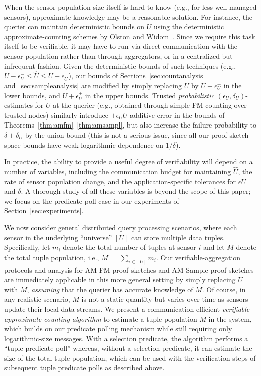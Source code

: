 \documentclass[10pt,twocolumn]{article}
\newcommand{\amfm}{AM-FM\xspace}
\newcommand{\amsampl}{AM-Sample\xspace}
\newcommand{\proofsketch}{proof sketch\xspace}
\newcommand{\proofsketches}{proof sketches\xspace}
\newcommand{\sstitle}[1]{\noindent{\bf #1\/}}
\begin{document}
{When the sensor population size itself is hard to know (e.g., for less well
managed sensors), approximate knowledge may
be a reasonable solution.  For instance, the querier can maintain
deterministic bounds on $U$ using the
deterministic approximate-counting schemes by Olston and
Widom~\cite{olston2000}.   Since we require this task itself to be
verifiable, it may have to run via direct communication with the
sensor population rather than through aggregators, or in a centralized but infrequent fashion.
Given the deterministic bounds of such techniques (e.g., 
$U-\epsilon^-_U \le \hat{U} \le U+\epsilon^+_U$),
our bounds of Sections~\ref{sec:countanalysis}
and~\ref{sec:sampleanalysis} are modified by simply replacing $U$ by
$U-\epsilon^-_U$ in the lower bounds, and $U+\epsilon^+_U$ in the upper
bounds.  
Trusted \emph{probabilistic} $(\epsilon_U, \delta_U)$-estimates for 
$U$ at the querier (e.g., obtained through simple FM counting over 
trusted nodes) similarly introduce $\pm\epsilon_U U$ additive error in
the bounds of Theorems~\ref{thm:amfm}--\ref{thm:amsampl}, but also 
increase the failure probability to $\delta+\delta_U$ by the union 
bound (this is not a serious issue, since all our \proofsketch  space bounds
 have weak logarithmic dependence on $1/\delta$).

In practice, the ability
to provide a useful degree of verifiability will depend on a number of
variables, including the communication budget for maintaining $\hat{U}$,
the rate of sensor population change, and the application-specific
tolerances for $\epsilon U$ and $\delta$.  A thorough study of all
these variables is beyond the scope of this paper; we focus on the
predicate poll case in our experiments of
Section~\ref{sec:experiments}.  
}


%
\sstitle{Multi-Tuple Sensors.}  We now consider general distributed query
processing scenarios, where each sensor in the underlying ``universe''
$[U]$ can store multiple data tuples.  Specifically, let $m_i$ denote
the total number of tuples at sensor $i$ and let $M$ denote the total
tuple population, i.e., $M=$ $\sum_{i\in [U]} m_i$.  Our
verifiable-aggregation protocols and analysis for \amfm \proofsketches
and \amsampl \proofsketches are immediately applicable in this more
general setting by simply replacing $U$ with $M$, {\em assuming\/} that
the querier has accurate knowledge of $M$.  Of course, in any realistic
scenario, $M$ is not a static quantity but varies over time as sensors
update their local data streams.  We present a
communication-efficient {\em verifiable approximate counting
algorithm\/} to estimate a tuple
population $M$ in the system, which builds on our predicate
polling mechanism while still requiring only logarithmic-size messages. With a selection predicate, the algorithm
performs a ``tuple predicate poll'' whereas, without a selection
predicate, it can estimate the size of the total tuple
population, which can be used with the verification steps of subsequent tuple
predicate polls as described above.
\end{document}
